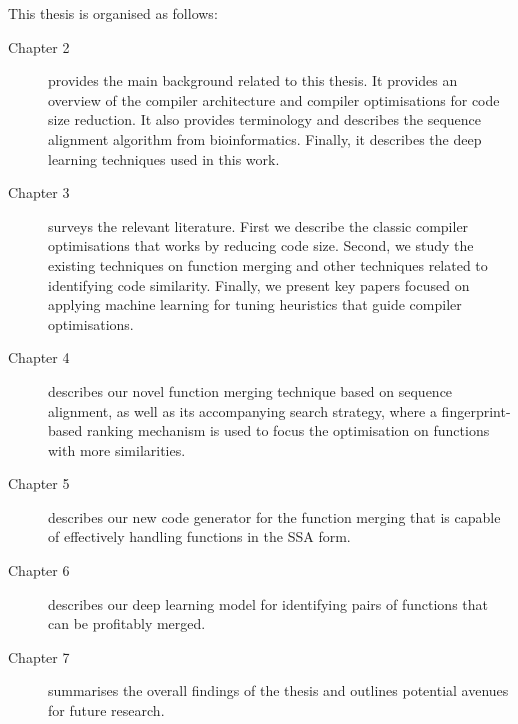 This thesis is organised as follows:
\begin{description}
\item[Chapter 2] provides the main background related to this thesis. It provides an overview of the compiler architecture and compiler optimisations for code size reduction.
It also provides terminology and describes the sequence alignment algorithm from bioinformatics.
Finally, it describes the deep learning techniques used in this work.
\item[Chapter 3] surveys the relevant literature. First we describe the classic compiler optimisations that works by reducing code size. Second, we study the existing techniques on function merging and other techniques related to identifying code similarity. Finally, we present key papers focused on applying machine learning for tuning heuristics that guide compiler optimisations.
\item[Chapter 4] describes our novel function merging technique based on sequence alignment, as well as its accompanying search strategy, where a fingerprint-based ranking mechanism is used to focus the optimisation on functions with more similarities.
\item[Chapter 5] describes our new code generator for the function merging that is capable of effectively handling functions in the SSA form.
\item[Chapter 6] describes our deep learning model for identifying pairs of functions that can be profitably merged.
\item[Chapter 7] summarises the overall findings of the thesis and outlines potential avenues for future research.
\end{description}
